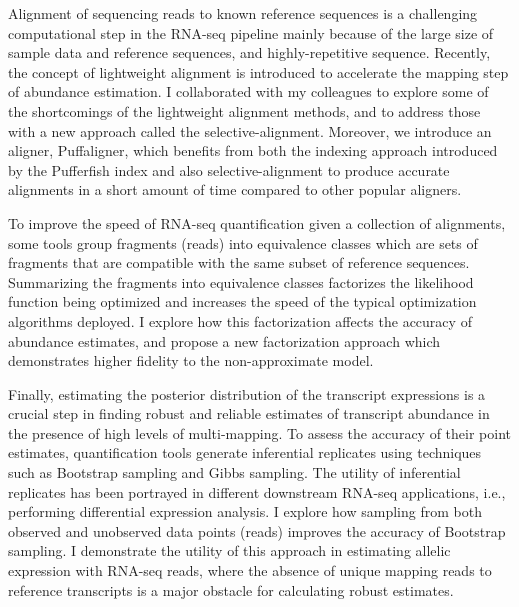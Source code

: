 Alignment of sequencing reads to known reference sequences is 
a challenging computational step in the RNA-seq pipeline mainly because of 
the large size of sample data and reference sequences, and highly-repetitive 
sequence. Recently, the concept of lightweight alignment
is introduced to accelerate the mapping step of abundance estimation. 
I collaborated with my colleagues to explore some 
of the shortcomings of the lightweight alignment methods, and to address 
those with a new approach called the selective-alignment. Moreover, we 
introduce an aligner, Puffaligner, which benefits from both the indexing 
approach introduced by the Pufferfish index and also selective-alignment 
to produce accurate alignments in a short amount of time compared to other 
popular aligners.

To improve the speed of RNA-seq quantification given a collection of alignments, 
some tools group fragments (reads) into equivalence classes which are sets of 
fragments that  are compatible with the same subset of reference sequences. 
Summarizing the fragments into equivalence classes factorizes the likelihood 
function being optimized and increases the speed of the typical optimization 
algorithms deployed. I explore how this factorization affects the accuracy of 
abundance estimates, and propose a new factorization approach which demonstrates 
higher fidelity to the non-approximate model.

Finally, estimating the posterior distribution of the transcript expressions is 
a crucial step in finding robust and reliable estimates of transcript abundance 
in the presence of high levels of multi-mapping. To assess the accuracy of their 
point estimates, quantification tools generate inferential replicates using 
techniques such as Bootstrap sampling and Gibbs sampling. The utility of inferential 
replicates has been portrayed in different downstream RNA-seq applications, i.e., 
performing differential expression analysis. I explore how sampling from both 
observed and unobserved data points (reads) improves the accuracy of Bootstrap 
sampling. I demonstrate the utility of this approach in estimating allelic 
expression with RNA-seq reads, where the absence of unique mapping reads to 
reference transcripts is a major obstacle for calculating robust estimates.